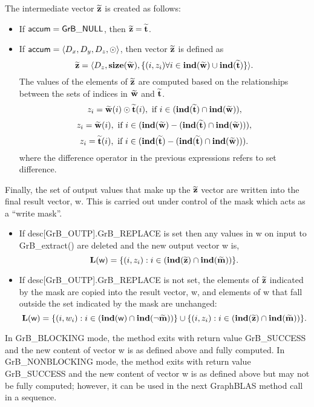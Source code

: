 The intermediate vector ${\bf \widetilde{z}}$ is created as follows:
\begin{itemize}
    \item If ${\sf accum} = {\sf GrB\_NULL}$, then ${\bf \widetilde{z}} = {\bf \widetilde{t}}$.

    \item If ${\sf accum} = \langle D_x, D_y, D_z, \odot \rangle$, then vector ${\bf \widetilde{z}}$ is defined as 
        \[ 
        {\bf \widetilde{z}} =        
        \langle D_z, \bold{size}({\bf \widetilde{w}}), 
		\{(i,z_{i})  \forall i \in \bold{ind}({\bf \widetilde{w}}) \cup 
        \bold{ind}({\bf \widetilde{t}}) \} \rangle.\]
    The values of the elements of ${\bf \widetilde{z}}$ are computed based on the relationships between the sets of indices in ${\bf \widetilde{w}}$ and ${\bf \widetilde{t}}$.
\[
z_{i} = {\bf \widetilde{w}}(i) \odot {\bf \widetilde{t}}(i), \ \mbox{if}\  i \in  (\bold{ind}({\bf \widetilde{t}}) \cap \bold{ind}({\bf \widetilde{w}})),
\]
\[
z_{i} = {\bf \widetilde{w}}(i), \ \mbox{if}\  i \in  (\bold{ind}({\bf \widetilde{w}}) - (\bold{ind}({\bf \widetilde{t}}) \cap \bold{ind}({\bf \widetilde{w}}))),
\]
\[
z_{i} = {\bf \widetilde{t}}(i), \ \mbox{if}\  i \in  (\bold{ind}({\bf \widetilde{t}}) - (\bold{ind}({\bf \widetilde{t}}) \cap \bold{ind}({\bf \widetilde{w}}))).
\]
where the difference operator in the previous expressions refers to set difference.
\end{itemize}

Finally, the set of output values that make up the ${\bf \widetilde{z}}$ 
vector are written into the final result vector, {\sf w}. 
This is carried out under control of the mask which acts as a ``write mask''.
\begin{itemize}
\item If {\sf desc[GrB\_OUTP].GrB\_REPLACE} is set then any values in {\sf w} 
on input to {\sf GrB\_extract()} are deleted and the new output vector {\sf w} is,
\[ \bold{L}({\sf w}) = \{(i,z_{i}) : i \in (\bold{ind}({\bf \widetilde{z}}) 
\cap \bold{ind}({\bf \widetilde{m}})) \}. \]

\item If {\sf desc[GrB\_OUTP].GrB\_REPLACE} is not set, the elements of 
${\bf \widetilde{z}}$ indicated by 
the mask are copied into the result vector, {\sf w}, and elements of 
{\sf w} that fall outside the set indicated by the mask are unchanged:
\[ \bold{L}({\sf w}) = \{(i,w_{i}) : i \in (\bold{ind}({\sf w}) 
\cap \bold{ind}(\neg {\bf \widetilde{m}})) \} \cup \{(i,z_{i}) : i \in 
(\bold{ind}({\bf \widetilde{z}}) \cap \bold{ind}({\bf \widetilde{m}})) \}. \]
\end{itemize}

In {\sf GrB\_BLOCKING} mode, the method exits with return value 
{\sf GrB\_SUCCESS} and the new content of vector {\sf w} is as defined above
and fully computed.  
In {\sf GrB\_NONBLOCKING} mode, the method exits with return value 
{\sf GrB\_SUCCESS} and the new content of vector {\sf w} is as defined above 
but may not be fully computed; however, it can be used in the next GraphBLAS 
method call in a sequence.
